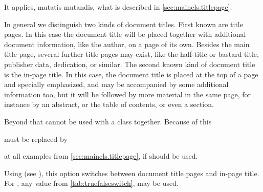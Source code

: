 \ifshortversion\IgnoreThisfalse{}\fi%
\ifIgnoreThis %
It applies, mutatis mutandis, what is described in
\autoref{sec:maincls.titlepage}.
\else %

In general we distinguish two kinds of document titles. First known are title
pages. In this case the document title will be placed together with additional
document information, like the author, on a page of its own. Besides the main
title page, several further title pages may exist, like the half-title or
bastard title, publisher data, dedication, or similar. The second known kind
of document title is the in-page title. In this case, the document title is
placed at the top of a page and specially emphasized, and may be accompanied
by some additional information too, but it will be followed by more material
in the same page, for instance by an abstract, or the table of contents, or
even a section.
\fi %

\ifIgnoreThis %
Beyond that  cannot be used with a \KOMAScript{}
class together. Because of this
must be replaced by
at all examples from \autoref{sec:maincls.titlepage}, if 
should be used.
\else %

\begin{Declaration}
\end{Declaration}%
Using  (see ), this option switches between document title pages
and in-page title. For , any value from 
\autoref{tab:truefalseswitch},  may be used.

